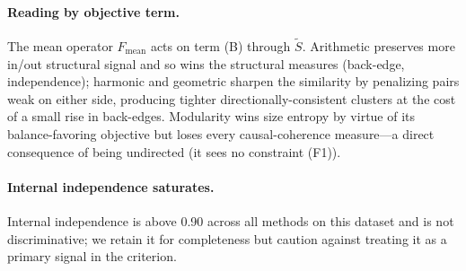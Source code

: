 \documentclass[table, 11pt]{article}
\begin{document}
\paragraph{Reading by objective term.}
The mean operator $F_{\text{mean}}$ acts on term (B) through $\tilde S$.
Arithmetic preserves more in/out structural signal and so wins the
structural measures (back-edge, independence); harmonic and geometric
sharpen the similarity by penalizing pairs weak on either side,
producing tighter directionally-consistent clusters at the cost of a
small rise in back-edges. Modularity wins size entropy by virtue of
its balance-favoring objective but loses every causal-coherence
measure---a direct consequence of being undirected (it sees no
constraint (F1)).

\paragraph{Internal independence saturates.}
Internal independence is above 0.90 across all methods on this
dataset and is not discriminative; we retain it for completeness but
caution against treating it as a primary signal in the criterion.
\end{document}
